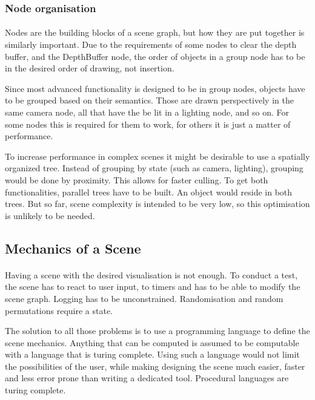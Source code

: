 \subsubsection{Node organisation}
\paragraph{}
Nodes are the building blocks of a scene graph, but how they are put together is similarly important. Due to the requirements of some nodes to clear the depth buffer, and the DepthBuffer node, the order of objects in a group node has to be in the desired order of drawing, not insertion.

Since most advanced functionality is designed to be in group nodes, objects have to be grouped based on their semantics. Those are drawn perspectively in the same camera node, all that have the be lit in a lighting node, and so on. For some nodes this is required for them to work, for others it is just a matter of performance.

To increase performance in complex scenes it might be desirable to use a spatially organized tree. Instead of grouping by state (such as camera, lighting), grouping would be done by proximity. This allows for faster culling. To get both functionalities, parallel trees have to be built. An object would reside in both trees. But so far, scene complexity is intended to be very low, so this optimisation is unlikely to be needed.


\subsection{Mechanics of a Scene\label{sceneMech}}
\paragraph{}
Having a scene with the desired visualisation is not enough. To conduct a test, the scene has to react to user input, to timers and has to be able to modify the scene graph. Logging has to be unconstrained. Randomisation and random permutations require a state.

The solution to all those problems is to use a programming language to define the scene mechanics. Anything that can be computed is assumed to be computable with a language that is turing complete\cite{turing}. Using such a language would not limit the possibilities of the user, while making designing the scene much easier, faster and less error prone than writing a dedicated tool. Procedural languages are turing complete.



